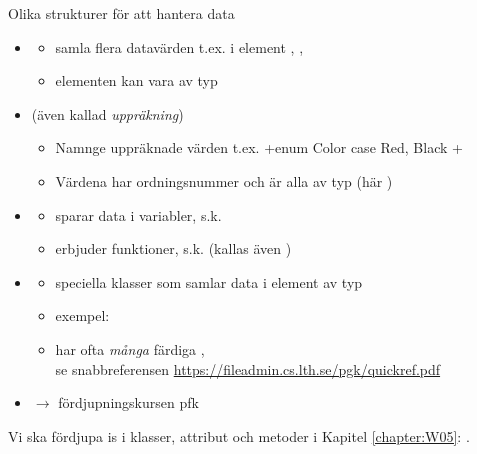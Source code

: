 \begin{Slide}{Olika strukturer för att hantera data}
\begin{itemize}\SlideFontTiny
\item {} 
\begin{itemize}\SlideFontTiny
\item samla flera datavärden t.ex.  i element , ,  
\item elementen kan vara av  typ
\end{itemize}
\item {} (även kallad \emph{uppräkning}) 
\begin{itemize}\SlideFontTiny
\item Namnge uppräknade värden t.ex. \code+enum Color { case Red, Black }+
\item Värdena har ordningsnummer och är alla av  typ (här )
\end{itemize}
\item {} 
\begin{itemize}\SlideFontTiny
\item sparar data i variabler, s.k. 
\item erbjuder funktioner, s.k.  (kallas även ) 
\end{itemize}

\item {}
  \begin{itemize}\SlideFontTiny
  \item speciella klasser som samlar data i element av  typ
  \item exempel: 
  \item har ofta \emph{många} färdiga , \\ se snabbreferensen \url{https://fileadmin.cs.lth.se/pgk/quickref.pdf}
  \end{itemize}

\item {} $\rightarrow$ fördjupningskursen pfk

\end{itemize}

\ifkompendium
Vi ska fördjupa is i klasser, attribut och metoder i Kapitel \ref{chapter:W05}: \ModWeekFIVE.

\ExplainAttribute 

\ExplainMethod 

\fi

\end{Slide}





